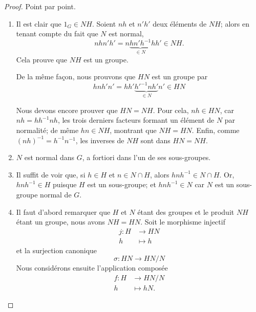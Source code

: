 \begin{proof}
	Point par point.
	\begin{enumerate}
		\item
		      Il est clair que \( 1_G \in NH \). Soient \( nh\) et \( n'h'\) deux éléments de \( NH \); alors en tenant compte du fait que \( N\) est normal,
		      \begin{equation}
			      nhn'h'=n\underbrace{hn'h^{-1}}_{\in N}hh'\in NH.
		      \end{equation}
		      Cela prouve que \( NH\) est un groupe.

		      De la même façon, nous prouvons que \( HN\) est un groupe par
		      \begin{equation}
			      hnh'n'=hh'\underbrace{h'^{-1}nh'}_{\in N}n'\in HN
		      \end{equation}

		      Nous devons encore prouver que \( HN=NH\). Pour cela, \( nh \in HN \), car \( nh = hh^{-1}nh \), les trois derniers facteurs formant un  élément de \( N \) par normalité; de même \( hn \in NH \), montrant que \( NH = HN \). Enfin, comme \( (nh)^{-1} = h^{-1} n^{-1} \), les inverses de \( NH \) sont dans \( HN = NH \).
		\item
		      \( N\) est normal dans \( G \), a fortiori dans l'un de ses sous-groupes.
		\item
		      Il suffit de voir que, si \( h \in H \) et \( n \in N \cap H \), alors \( hnh^{-1} \in N \cap H \). Or, \( hnh^{-1} \in H \) puisque \( H\) est un sous-groupe; et \( hnh^{-1} \in N \) car \( N \) est un sous-groupe normal de \( G \).
		\item
		      Il faut d'abord remarquer que \( H\) et \( N\) étant des groupes et le produit \( NH\) étant un groupe, nous avons \( NH=HN\). Soit le morphisme injectif
		      \begin{equation}
			      \begin{aligned}
				      j\colon H & \to HN    \\
				      h         & \mapsto h
			      \end{aligned}
		      \end{equation}
		      et la surjection canonique
		      \begin{equation}
			      \sigma\colon HN\to HN/N
		      \end{equation}
		      Nous considérons ensuite l'application composée
		      \begin{equation}
			      \begin{aligned}
				      f\colon H & \to HN/N    \\
				      h         & \mapsto hN.
			      \end{aligned}
		      \end{equation}


\end{enumerate}
\end{proof}
